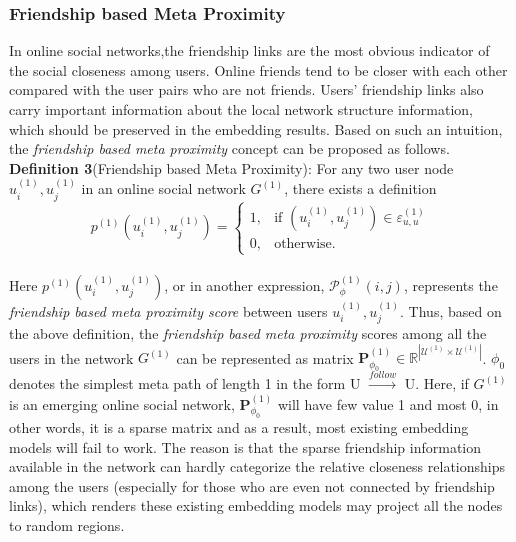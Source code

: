 \documentclass{article}
\begin{document}
\subsubsection{Friendship based Meta Proximity}
In online social networks,the friendship links are the most obvious indicator of the social
closeness among users. Online friends tend to be closer with each
other compared with the user pairs who are not friends. Users’
friendship links also carry important information about the local
network structure information, which should be preserved in the
embedding results. Based on such an intuition, the
\emph{friendship based meta proximity} concept can be proposed as follows.\\
\textbf{Definition 3}(Friendship based Meta Proximity): For any two user node $u_{i}^{(1)}, u_{j}^{(1)}$ in an online social network $G^{(1)}$, there exists a definition\\
$$ p^{(1)}(u_{i}^{(1)}, u_{j}^{(1)}) =
\begin{cases}
  1, & \mbox{if } (u_{i}^{(1)}, u_{j}^{(1)})\in \varepsilon_{u,u}^{(1)} \\
  0, & \mbox{otherwise}.
\end{cases}$$\\
\indent Here $p^{(1)}(u_{i}^{(1)}, u_{j}^{(1)})$, or in another expression, $\mathcal{P}_{\phi}^{(1)}(i,j)$, represents the \emph{friendship based meta proximity score} between users $u_{i}^{(1)}, u_{j}^{(1)}$. Thus, based on the above definition, the \emph{friendship based meta proximity} scores among all the users in the network $G^{(1)}$ can be represented as matrix $\mathbf{P}_{\phi_{0}}^{(1)}\in \mathbb{R}^{|\mathcal{U}^{(1)}\times \mathcal{U}^{(1)}|}$. $\phi_{0}$ denotes the simplest meta path of length 1 in the form U $\xrightarrow{follow}$ U. Here, if $G^{(1)}$ is an emerging online social network, $\mathbf{P}_{\phi_{0}}^{(1)}$ will have few value 1 and most 0, in other words, it is a sparse matrix and as a result, most existing embedding models will fail to work. The reason is that the sparse friendship information available in the network can hardly categorize the relative closeness relationships among the users (especially for those who are even not connected by friendship links), which renders these existing embedding models may project all the nodes to random regions.
\end{document}

